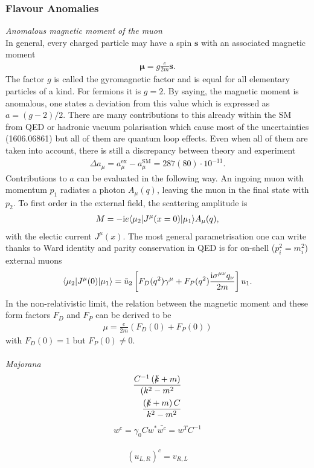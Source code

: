\subsubsection{Flavour Anomalies}
\label{sec_flAnom}
\textit{Anomalous magnetic moment of the muon}\\
\noindent
In general, every charged particle
may have a spin $\boldsymbol{s}$ with an associated magnetic moment \cite{anomMom}
\begin{align}
 \boldsymbol{\mu} = g \frac{e}{2m}\boldsymbol{s}.
\end{align}
The factor $g$ is called the gyromagnetic factor and is equal for all elementary particles of a kind. For fermions it is $g=2$. By saying, the magnetic 
moment is anomalous, one states a deviation from this value which is expressed as $a= (g-2)/2$. There are many contributions to this already within the SM
from QED or hadronic vacuum polarisation which cause most of the uncertainties (1606.06861) but all of them are quantum loop effects. Even when all of them are taken into account, there is still a discrepancy
between theory and experiment 
\begin{align}
 \Delta a_\mu = a_\mu^\text{ex} - a_\mu^\text{SM} = 287(80)\cdot 10^{-11}.
\end{align}
Contributions to $a$ can be evaluated in the following way. An ingoing muon with momentum $p_1$ radiates a photon $A_\mu (q)$, leaving the muon in the final 
state with $p_2$. To first order in the external field, the scattering amplitude is 
\begin{align}
 M = -\text{i} e \langle \mu_2|J^\mu(x=0)|\mu_1\rangle A_\mu(q),
\end{align}
with the electic current $J^\mu(x)$. The most general parametrisation one can write thanks to Ward identity and parity conservation in QED is for on-shell
($p_i^2 = m_i^2$) external muons
\begin{align}
 \langle \mu_2|J^\mu(0)|\mu_1\rangle = \bar u_2 \left[F_D(q^2)\gamma^\mu + F_P(q^2)\frac{\text{i} \sigma^{\mu\nu}q_\nu}{2m}\right] u_1.
 \label{eq_gordon}
\end{align}
In the non-relativistic limit, the relation between the magnetic moment and these form factors $F_D$ and $F_P$ can be derived to be
\begin{align}
 \mu = \frac{e}{2m}\left(F_D(0) + F_P(0)\right)
\end{align}
\noindent
with $F_D(0)=1$ but $F_P(0)\neq0$.
\\ \\ \textit{Majorana}\\
\begin{equation}
\begin{aligned}
 \frac{C^{-1}\left(\slashed{k}+m\right)}{(k^2-m^2}\\
 \frac{\left(\slashed{k}+m\right)C}{k^2-m^2}
\end{aligned}
\label{eq_majoProp}
\end{equation}
\begin{equation}
\begin{aligned}
 w^c = \gamma_0 C w^*
 \bar {w^c}= w^T C^{-1}
\end{aligned}
\label{eq_ChargeConj}
\end{equation}

\begin{align}
 \left(u_{L,R}\right)^c = v_{R,L}
\end{align}



